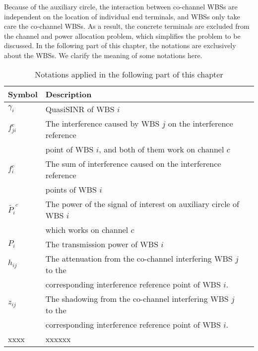 Because of the auxiliary circle, the interaction between co-channel WBSs are independent on the location of individual end terminals, and WBSs only take care the co-channel WBSs. 
As a result,  the concrete terminals are excluded from the channel and power allocation problem, which simplifies the problem to be discussed. 
In the following part of this chapter, the notations are exclusively about the WBSs.
We clarify the meaning of some notations here.

\begin{table}[h]
\caption{Notations applied in the following part of this chapter}
\label{tab1}
\centering
\begin{tabular}{llr}
\toprule
Symbol & Description \\
\midrule
$\gamma_i$ & QuasiSINR of WBS $i$\\
$f_{ji}^c$  & The interference caused by WBS $j$ on the interference reference \\
			& point of WBS $i$, and both of them work on channel $c$\\
$f_i^c$ & The sum of interference caused on the interference reference \\
			& points of WBS $i$ \\
$\tilde{P_i}^c$ & The power of the signal of interest on auxiliary circle of WBS $i$ \\
			& which works on channel $c$     \\
$P_i$		& The transmission power of WBS $i$\\
$h_{ij}$ & The attenuation from the co-channel interfering WBS $j$ to the \\
		& corresponding interference reference point of WBS $i$.\\
$z_{ij}$ & The shadowing from the co-channel interfering  WBS $j$ to the\\
		& corresponding interference reference point of WBS $i$.\\
xxxx & xxxxxx\\
\bottomrule
\end{tabular}
\end{table}




